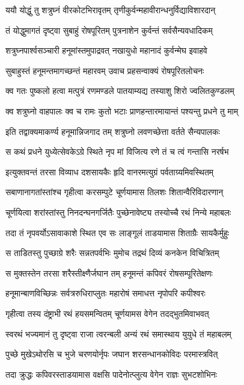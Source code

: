 \twolineshloka
{ययौ योद्धुं तु शत्रुघ्नं वीरकोटभिरावृतम्}
{तृणीकुर्वन्महावीरान्धनुर्विद्याविशारदान्}%

\twolineshloka
{तं योद्धुमागतं दृष्ट्वा सुबाहुं रोषपूरितम्}
{पुत्रनाशेन कुर्वन्तं सर्वसैन्यवधादिकम्}%

\twolineshloka
{शत्रुघ्नपार्श्वसञ्चारी हनूमांस्तमुपाद्रवत्}
{नखायुधो महानादं कुर्वन्मेघ इवाहवे}%

\twolineshloka
{सुबाहुस्तं हनूमन्तमागच्छन्तं महारवम्}
{उवाच प्रहसन्वाक्यं रोषपूरितलोचनः}%

\twolineshloka
{क्व गतः पुष्कलो हत्वा मत्पुत्रं रणमण्डले}
{पातयाम्यद्य तस्याशु शिरो ज्वलितकुण्डलम्}%

\twolineshloka
{क्व शत्रुघ्नो वाहपालः क्व च रामः कुतो भटाः}
{प्राणहन्तारमायान्तं पश्यन्तु प्रधने तु माम्}%

\twolineshloka
{इति तद्वाक्यमाकर्ण्य हनूमान्निजगाद तम्}
{शत्रुघ्नो लवणच्छेत्ता वर्तते सैन्यपालकः}%

\twolineshloka
{स कथं प्रधने युध्येत्सेवकेऽग्रे स्थिते नृप}
{मां विजित्य रणे तं च त्वं गन्तासि नरर्षभ}%

\twolineshloka
{इत्युक्तवन्तं तरसा विव्याध दशसायकैः}
{हृदि वानरमत्युग्रं पर्वताग्र्यमिवस्थितम्}%

\twolineshloka
{सबाणानागतांस्तांश्च गृहीत्वा करसम्पुटे}
{चूर्णयामास तिलशः शितान्वैरिविदारणान्}%

\twolineshloka
{चूर्णयित्वा शरांस्तांस्तु निनदन्घनगर्जितैः}
{पुच्छेनावेष्ट्य तस्योच्चै रथं निन्ये महाबलः}%

\twolineshloka
{तदा तं नृपवर्योऽसावाकाशे स्थित एव सः}
{लाङ्गूलं ताडयामास शिताग्रैः सायकैर्मुहुः}%

\twolineshloka
{स ताडितस्तु पुच्छाग्रे शरैः सन्नतपर्वभिः}
{मुमोच तद्रथं दिव्यं कनकेन विचित्रितम्}%

\twolineshloka
{स मुक्तस्तेन तरसा शरैस्तीक्ष्णैर्जघान तम्}
{हनूमन्तं कपिवरं रोषसम्पूरितेक्षणः}%

\twolineshloka
{हनूमान्बाणविच्छिन्नः सर्वत्ररुधिराप्लुतः}
{महारोषं समाधत्त नृपोपरि कपीश्वरः}%

\twolineshloka
{गृहीत्वा तस्य दंष्ट्राभी रथं हयसमन्वितम्}
{चूर्णयामस वेगेन तदद्भुतमिवाभवत्}%

\twolineshloka
{स्वरथं भज्यमानं तु दृष्ट्वा राजा त्वरन्बली}
{अन्यं रथं समास्थाय युयुधे तं महाबलम्}%

\twolineshloka
{पुच्छे मुखेऽथोरसि च भुजे चरणयोर्नृपः}
{जघान शरसन्धानकोविदः परमास्त्रवित्}%

\twolineshloka
{तदा क्रुद्धः कपिवरस्ताडयामास वक्षसि}
{पादेनोत्प्लुत्य वेगेन राज्ञः सुभटशोभिनः}%

